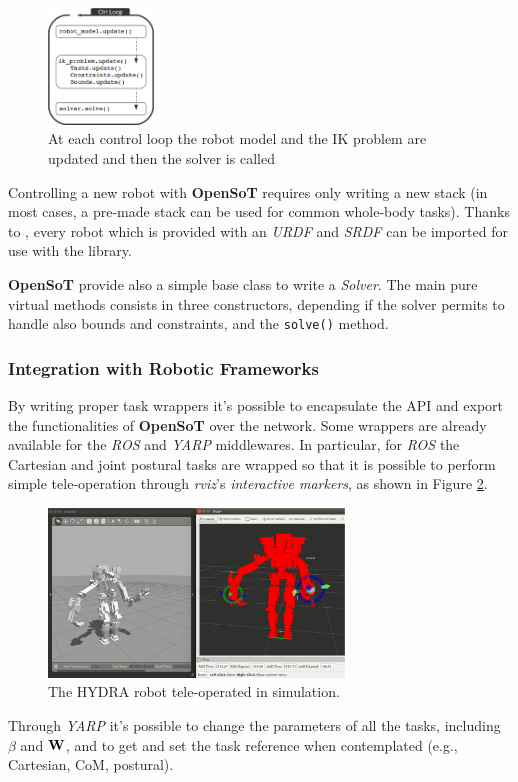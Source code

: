 \begin{figure}[!ht]
\vspace{2 mm}
\centering
\includegraphics[width=0.25\textwidth]{images/software/update.eps}
\caption{At each control loop the robot model and the IK problem are updated and then the solver is called}
\label{update}
\end{figure}

Controlling a new robot with \textbf{OpenSoT} requires only writing a new stack (in most cases, a pre-made stack can be used for common whole-body tasks). Thanks to , every robot which is provided with an \emph{URDF} and \emph{SRDF} can be imported for use with the library.

\textbf{OpenSoT} provide also a simple base class to write a \emph{Solver}. The main pure virtual methods consists in three constructors, depending if the solver permits to handle also bounds and constraints, and the \texttt{\small solve()} method. 

\subsubsection{Integration with Robotic Frameworks}
\label{sec:integration_with_robotic_frameworks}
By writing proper task wrappers it's possible to encapsulate the API and export the functionalities of \textbf{OpenSoT} over the network. Some wrappers are already available for the \emph{ROS} and \emph{YARP} middlewares. In particular, for \emph{ROS} the Cartesian and joint postural tasks are wrapped so that it is possible to perform simple tele-operation  through \emph{rviz}'s \emph{interactive markers}, as shown in Figure \ref{opensot_interactive_markers}.
\begin{figure}[!ht]
\vspace{2 mm}
\centering
\includegraphics[width=0.7\textwidth]{images/software/hydra_tele_operation.eps}
\caption{The HYDRA robot tele-operated in simulation.}
\label{opensot_interactive_markers}
\end{figure}
Through \emph{YARP} it's possible to change the parameters of all the tasks, including $\beta$ and $\mathbf{W}$, and to get and set the task reference when contemplated (e.g., Cartesian, CoM, postural).

